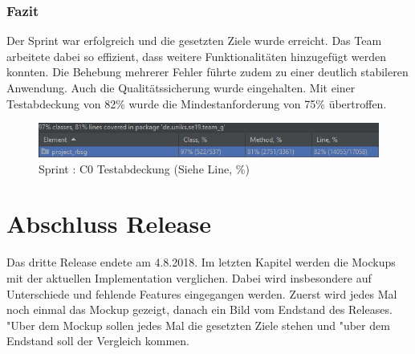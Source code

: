 \documentclass[12pt, titlepage]{scrartcl}
\newcommand{\RN}[1]{%
	\textup{\uppercase\expandafter{\romannumeral#1}}%
}
\begin{document}
	    	\subsubsection{Fazit}
	    		Der Sprint \RN{6} war erfolgreich und die gesetzten Ziele wurde erreicht. Das Team arbeitete dabei so effizient, dass weitere Funktionalit\"aten hinzugef\"ugt werden konnten. Die Behebung mehrerer Fehler f\"uhrte zudem zu einer deutlich stabileren Anwendung. Auch die Qualit\"atssicherung wurde eingehalten. Mit einer Testabdeckung von 82\% wurde die Mindestanforderung von 75\% \"ubertroffen.
	    		\begin{figure}[H] 
	    			\centering
	    			\includegraphics[width=\textwidth]{images/sprintVI/coverage.png}
	    			\caption{Sprint \RN{6}: C0 Testabdeckung (Siehe Line, \%)}
	    			\label{Coverage_6}
	    		\end{figure} 
	\newpage
	\section{Abschluss Release \RN{3}}
		Das dritte Release endete am 4.8.2018. Im letzten Kapitel werden die Mockups mit der aktuellen Implementation verglichen. Dabei wird insbesondere auf Unterschiede und fehlende Features eingegangen werden. Zuerst wird jedes Mal noch einmal das Mockup gezeigt, danach ein Bild vom Endstand des Releases. "Uber dem Mockup sollen jedes Mal die gesetzten Ziele stehen und "uber dem Endstand soll der Vergleich kommen.
\end{document}
